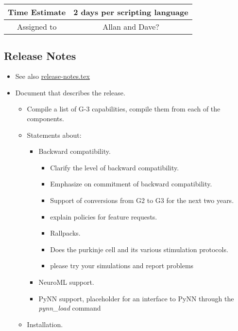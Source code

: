 \documentclass[12pt]{article}
\begin{document}
\begin{center}
  \vspace{5mm}
  \centering
  \begin{tabular}{|c|c|}
    \hline
    Time Estimate
    & 2 days per scripting language \\
    \hline
    Assigned to
    & Allan and Dave? \\
    \hline
  \end{tabular}
\end{center}


\subsection{Release Notes}

\begin{itemize}
\item See also \href{../release-notes/release-notes.tex}{release-notes.tex}
\item Document that describes the release.
  \begin{itemize}
  \item Compile a list of G-3 capabilities, compile them from each of the components.
  \item Statements about:
    \begin{itemize}
    \item Backward compatibility.
      \begin{itemize}
      \item Clarify the level of backward compatibility. 
      \item Emphasize on commitment of backward compatibility.
      \item Support of conversions from G2 to G3 for the next two years.
      \item explain policies for feature requests.
      \item Rallpacks.
      \item Does the purkinje cell and its various stimulation protocols.
      \item please try your simulations and report problems
      \end{itemize}
    \item NeuroML support.
    \item PyNN support, placeholder for an interface to PyNN through the
      {\it pynn\_load} command
    \end{itemize}
  \item Installation.
    \begin{itemize}

\end{itemize}
\end{itemize}
\end{itemize}
\end{document}

